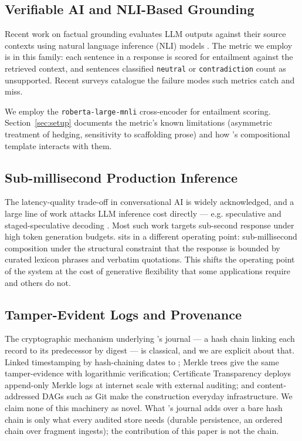 \subsection{Verifiable AI and NLI-Based Grounding}

Recent work on factual grounding evaluates LLM outputs against
their source contexts using natural language inference (NLI)
models \citep{honovich2022true, gekhman2023trueteacher}. The
\unsupf{} metric we employ is in this family: each sentence in
a response is scored for entailment against the retrieved
context, and sentences classified \texttt{neutral} or
\texttt{contradiction} count as unsupported. Recent surveys
\citep{huang2023hallucinationsurvey,
ji2023hallucinationsurvey} catalogue the failure modes such
metrics catch and miss.

We employ the \texttt{roberta-large-mnli} cross-encoder
\citep{liu2019roberta} for entailment scoring. Section~\ref{sec:setup}
documents the metric's known limitations
(asymmetric treatment of hedging, sensitivity to scaffolding
prose) and how \hyphae{}'s compositional template interacts
with them.

\subsection{Sub-millisecond Production Inference}

The latency-quality trade-off in conversational AI is widely
acknowledged, and a large line of work attacks LLM inference cost
directly --- e.g. speculative and staged-speculative decoding
\citep{leviathan2023speculative, chen2023fastinference}. Most
such work targets sub-second response under high token
generation budgets. \hyphae{} sits in a different operating
point: sub-millisecond composition under the structural
constraint that the response is bounded by curated lexicon
phrases and verbatim quotations. This shifts the operating
point of the system at the cost of generative flexibility
that some applications require and others do not.

\subsection{Tamper-Evident Logs and Provenance}

The cryptographic mechanism underlying \hyphae{}'s journal --- a
hash chain linking each record to its predecessor by digest --- is
classical, and we are explicit about that. Linked timestamping by
hash-chaining dates to \citet{haber1991timestamp}; Merkle trees
\citep{merkle1988digital} give the same tamper-evidence with
logarithmic verification; Certificate Transparency
\citep{laurie2014ct} deploys append-only Merkle logs at internet
scale with external auditing; and content-addressed DAGs such as
Git \citep{git} make the construction everyday infrastructure. We
claim none of this machinery as novel. What \hyphae{}'s journal
adds over a bare hash chain is only what every audited store needs
(durable persistence, an ordered chain over fragment ingests); the
contribution of this paper is not the chain.

